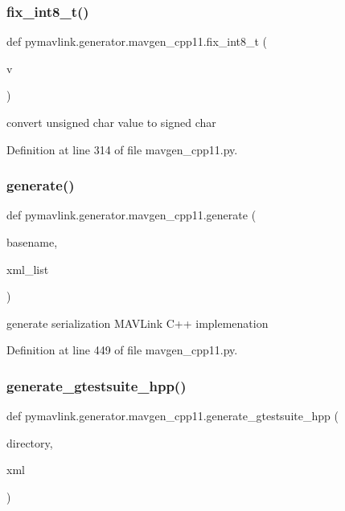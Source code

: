 \subsubsection{\texorpdfstring{fix\_int8\_t()}{fix\_int8\_t()}}
{\footnotesize\ttfamily def pymavlink.\+generator.\+mavgen\+\_\+cpp11.\+fix\+\_\+int8\+\_\+t (\begin{DoxyParamCaption}\item[{}]{v }\end{DoxyParamCaption})}

\begin{DoxyVerb}convert unsigned char value to signed char\end{DoxyVerb}
 

Definition at line 314 of file mavgen\+\_\+cpp11.\+py.

\mbox{\label{namespacepymavlink_1_1generator_1_1mavgen__cpp11_aa4f8d0bd184389b7d9c14bba66482add}} 
\subsubsection{\texorpdfstring{generate()}{generate()}}
{\footnotesize\ttfamily def pymavlink.\+generator.\+mavgen\+\_\+cpp11.\+generate (\begin{DoxyParamCaption}\item[{}]{basename,  }\item[{}]{xml\+\_\+list }\end{DoxyParamCaption})}

\begin{DoxyVerb}generate serialization MAVLink C++ implemenation\end{DoxyVerb}
 

Definition at line 449 of file mavgen\+\_\+cpp11.\+py.

\mbox{\label{namespacepymavlink_1_1generator_1_1mavgen__cpp11_a1eb8c2ef48de5401c229cf9815761666}} 
\subsubsection{\texorpdfstring{generate\_gtestsuite\_hpp()}{generate\_gtestsuite\_hpp()}}
{\footnotesize\ttfamily def pymavlink.\+generator.\+mavgen\+\_\+cpp11.\+generate\+\_\+gtestsuite\+\_\+hpp (\begin{DoxyParamCaption}\item[{}]{directory,  }\item[{}]{xml }\end{DoxyParamCaption})}

